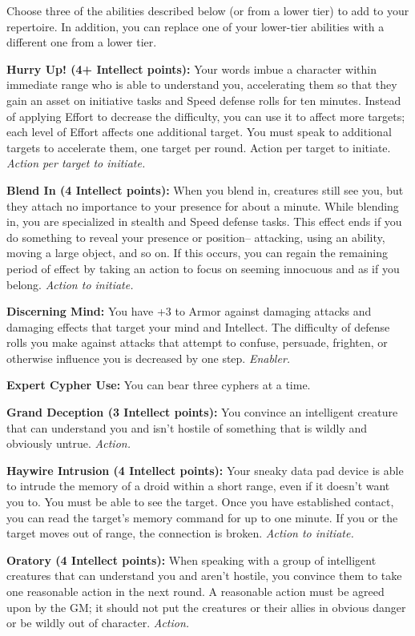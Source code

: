 \documentclass[a4paper,10pt,final,twocolumn,oneside]{book}
\newcommand{\itemAbility}[2]{\textcolor{25gray}{\textbullet\textbf{ #1:}}{ #2}\par}
\newcommand{\enabler}{\textit{ Enabler.}}
\newcommand{\action}{\textit{ Action.}}
\newcommand{\actionInit}{\textit{ Action to initiate.}}
\newcommand{\actionInitTarget}{\textit{ Action per target to initiate.}}
\begin{document}
Choose three of the abilities described below (or from a lower tier) to add to your repertoire. In addition, you can replace one of your lower-tier abilities with a different one from a lower tier.

\itemAbility{Hurry Up! (4+ Intellect points)}{Your words imbue a character within immediate range who is able to understand you, accelerating them so that they gain an asset on initiative tasks and Speed defense rolls for ten minutes. Instead of applying Effort to decrease the difficulty, you can use it to affect more targets; each level of Effort affects one additional target. You must speak to additional targets to accelerate them, one target per round. Action per target to initiate.\actionInitTarget}

\itemAbility{Blend In (4 Intellect points)}{When you blend in, creatures still see you, but they attach no importance to your presence for about a minute. While blending in, you are specialized in stealth and Speed defense tasks. This effect ends if you do something to reveal your presence or position-- attacking, using an ability, moving a large object, and so on. If this occurs, you can regain the remaining period of effect by taking an action to focus on seeming innocuous and as if you belong.\actionInit}

\itemAbility{Discerning Mind}{You have +3 to Armor against damaging attacks and damaging effects that target your mind and Intellect. The difficulty of defense rolls you make against attacks that attempt to confuse, persuade, frighten, or otherwise influence you is decreased by one step.\enabler}

\itemAbility{Expert Cypher Use}{You can bear three cyphers at a time.}

\itemAbility{Grand Deception (3 Intellect points)}{You convince an intelligent creature that can understand you and isn’t hostile of something that is wildly and obviously untrue.\action}

\itemAbility{Haywire Intrusion (4 Intellect points)}{ Your sneaky data pad device is able to intrude the memory of a droid within a short range, even if it doesn’t want you to. You must be able to see the target. Once you have established contact, you can read the target’s memory command for up to one minute. If you or the target moves out of range, the connection is broken.\actionInit}

\itemAbility{Oratory (4 Intellect points)}{When speaking with a group of intelligent creatures that can understand you and aren’t hostile, you convince them to take one reasonable action in the next round. A reasonable action must be agreed upon by the GM; it should not put the creatures or their allies in obvious danger or be wildly out of character.\action}
\end{document}
